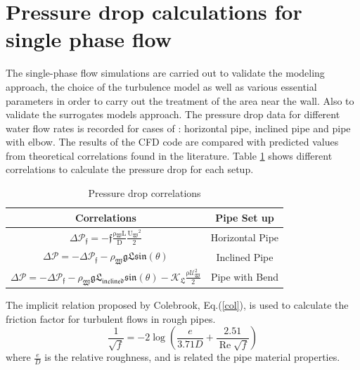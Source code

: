\documentclass[11pt]{report}
\begin{document}
\section{Pressure drop calculations for single phase flow}\label{single}
The single-phase flow simulations are carried out to validate the modeling approach, the choice of the turbulence model as well as various essential parameters in order to carry out the treatment of the area near the wall. Also to validate the surrogates models approach. The pressure drop data for different water flow rates is recorded for cases of : horizontal pipe, inclined pipe and pipe with elbow. The results of the CFD code are compared with predicted values from theoretical correlations found in the literature. Table \ref{tab:PD} shows different correlations to calculate the pressure drop for each setup.
\begin{table}[ht!]
\begin{center}
\caption{Pressure drop correlations}\label{tab:PD}
\begin{tabular}{cc}
\hline Correlations & Pipe Set up  \\
\hline
$ \displaystyle 
\Delta \mathcal{P_\mathfrak{f}=\mathfrak{-f}\frac{\mathrm{\rho\mathfrak{_{W}}} \mathrm{L}}{\mathrm{D}} \frac{\mathrm{U\mathfrak{_{W}}}^\mathrm{{2}}}{\mathrm{2}}}
$ & Horizontal Pipe \\
$ \displaystyle 
\Delta \mathcal{P}=-\Delta \mathcal{P_\mathfrak{f}-\rho_\mathfrak{{W}} \mathfrak{g} \mathfrak{ L} \mathfrak{sin(\theta)}}
$ & Inclined Pipe \\
$ \displaystyle 
\Delta \mathcal{P} =-\Delta \mathcal{ P_\mathfrak{f}-\rho_\mathfrak{{W}} \mathfrak{g} \mathfrak{L}_\mathfrak{{inclined}} \mathfrak{sin(\theta)}- K_\mathfrak{{L}} \frac{\mathrm{\rho} U_\mathfrak{{W}}^\mathrm{{2}}}{\mathrm{2}}}
$ & Pipe with Bend   \\
\hline
\end{tabular}
\end{center}
\end{table}

The implicit relation proposed by Colebrook, Eq.(\ref{col}), is used to calculate the friction factor for turbulent flows in rough pipes.
\begin{equation}
\frac{1}{\sqrt{f}}=-2 \log \left(\frac{e}{3.71 D}+\frac{2.51}{\operatorname{Re} \sqrt{f}}\right)
\label{col}
\end{equation}
where $\frac{e}{D}$ is the relative roughness, and is related the pipe material properties.
\end{document}
